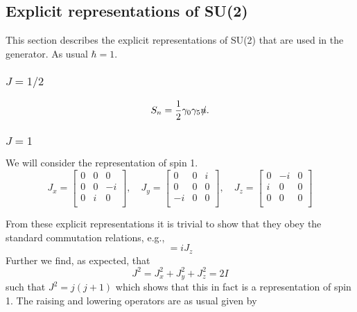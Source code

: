 \subsection{Explicit representations of SU(2)}

This section describes the explicit representations of SU(2) that
are used in the generator. As usual $\hbar=1$.

\subsubsection{$J=1/2$}

\begin{equation}
S_n={1\over 2}\gamma_0\gamma_5 n\!\!\!/.
\end{equation}

\subsubsection{$J=1$}

We will consider the representation of spin 1. 
\begin{equation}
J_x=\left[\begin{array}{rrr}
          0 & 0 & 0  \\
          0 & 0 &-i  \\
          0 & i & 0  \\
          \end{array}\right],\quad
J_y=\left[\begin{array}{rrr}
          0 & 0 & i  \\
          0 & 0 & 0  \\
          -i& 0 & 0  \\
          \end{array}\right],\quad
J_z=\left[\begin{array}{rrr}
          0 &-i & 0  \\
          i & 0 & 0  \\
          0 & 0 & 0  \\
          \end{array}\right]
\end{equation}
 
From these explicit representations it is trivial to show that they
obey the standard commutation relations, e.g.,
\begin{equation}
[J_x,J_y]=iJ_z
\end{equation}
Further we find, as expected, that
\begin{equation}
J^2=J_x^2+J_y^2+J_z^2=2I
\end{equation}
such that $J^2=j(j+1)$ which shows that this in fact is a 
representation of spin 1. The raising and lowering operators
are as usual given by

